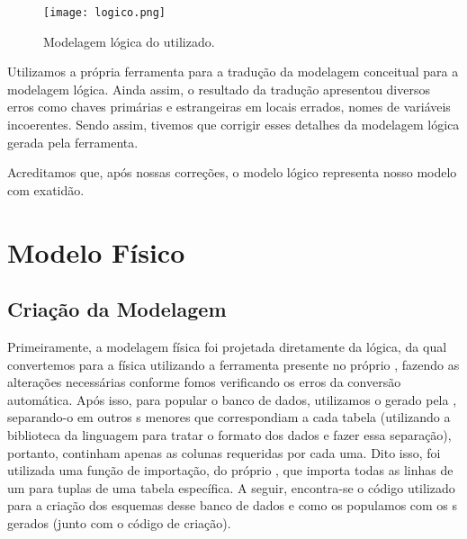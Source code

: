   \vspace{2cm}
  \begin{figure}[H]
    \centering
    \texttt{[image: logico.png]}
    \caption{Modelagem lógica do  utilizado.}
  \end{figure}

  Utilizamos a própria ferramenta  para a tradução da modelagem conceitual para a modelagem lógica. Ainda assim, o resultado da tradução apresentou diversos erros como chaves primárias e estrangeiras em locais errados, nomes de variáveis incoerentes. Sendo assim, tivemos que corrigir esses detalhes da modelagem lógica gerada pela ferramenta.

  Acreditamos que, após nossas correções, o modelo lógico representa nosso modelo com exatidão.

\newpage
\section{Modelo Físico}
\subsection{Criação da Modelagem}

Primeiramente, a modelagem física foi projetada diretamente da lógica, da qual convertemos para a física utilizando a ferramenta presente no próprio , fazendo as alterações necessárias conforme fomos verificando os erros da conversão automática. Após isso, para popular o banco de dados, utilizamos o  gerado pela , separando-o em outros s menores que correspondiam a cada tabela (utilizando a biblioteca  da linguagem  para tratar o formato dos dados e fazer essa separação), portanto, continham apenas as colunas requeridas por cada uma. Dito isso, foi utilizada uma função de importação, do próprio , que importa todas as linhas de um  para tuplas de uma tabela específica. A seguir, encontra-se o código utilizado para a criação dos esquemas desse banco de dados e como os populamos com os s gerados (junto com o código de criação).

